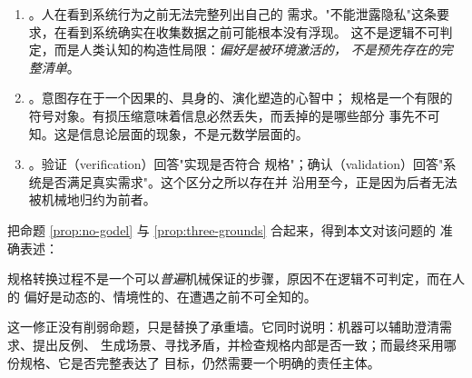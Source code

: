 \begin{proposition}[意图鸿沟的三条认识论根据]\label{prop:three-grounds}
\begin{enumerate}[label=(\roman*)]
\item {}。人在看到系统行为之前无法完整列出自己的
      需求。"不能泄露隐私"这条要求，在看到系统确实在收集数据之前可能根本没有浮现。
      这不是逻辑不可判定，而是人类认知的构造性局限：\emph{偏好是被环境激活的，
      不是预先存在的完整清单}。
\item {}。意图存在于一个因果的、具身的、演化塑造的心智中；
      规格是一个有限的符号对象。有损压缩意味着信息必然丢失，而丢掉的是哪些部分
      事先不可知。这是信息论层面的现象，不是元数学层面的。
\item {}。验证（verification）回答"实现是否符合
      规格"；确认（validation）回答"系统是否满足真实需求"。这个区分之所以存在并
      沿用至今，正是因为后者无法被机械地归约为前者。
\end{enumerate}
\end{proposition}

把命题 \ref{prop:no-godel} 与 \ref{prop:three-grounds} 合起来，得到本文对该问题的
准确表述：

\begin{principle}[意图鸿沟的准确表述]\label{pr:gap}
规格转换过程不是一个可以\emph{普遍}机械保证的步骤，原因不在逻辑不可判定，而在人的
偏好是动态的、情境性的、在遭遇之前不可全知的。
\end{principle}

这一修正没有削弱命题，只是替换了承重墙。它同时说明：机器可以辅助澄清需求、提出反例、
生成场景、寻找矛盾，并检查规格内部是否一致；而最终采用哪份规格、它是否完整表达了
目标，仍然需要一个明确的责任主体。

